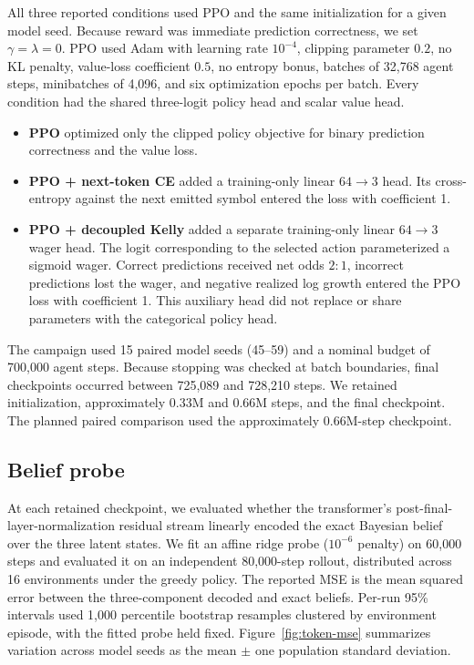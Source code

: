 \documentclass[11pt]{article}
\begin{document}
All three reported conditions used PPO and the same initialization for a given
model seed. Because reward was immediate prediction correctness, we set
\(\gamma=\lambda=0\). PPO used Adam with learning rate
\(10^{-4}\), clipping parameter \(0.2\), no KL penalty, value-loss coefficient
\(0.5\), no entropy bonus, batches of 32,768 agent steps, minibatches of 4,096,
and six optimization epochs per batch. Every condition had the shared
three-logit policy head and scalar value head.

\begin{itemize}
  \item \textbf{PPO} optimized only the clipped policy objective for binary
    prediction correctness and the value loss.
  \item \textbf{PPO + next-token CE} added a training-only linear
    \(64\!\rightarrow\!3\) head. Its cross-entropy against the next emitted
    symbol entered the loss with coefficient 1.
  \item \textbf{PPO + decoupled Kelly} added a separate training-only linear
    \(64\!\rightarrow\!3\) wager head. The logit corresponding to the selected
    action parameterized a sigmoid wager. Correct predictions received net
    odds \(2{:}1\), incorrect predictions lost the wager, and negative realized
    log growth entered the PPO loss with coefficient 1. This auxiliary head
    did not replace or share parameters with the categorical policy head.
\end{itemize}

The campaign used 15 paired model seeds (45--59) and a nominal budget of
700,000 agent steps. Because stopping was checked at batch boundaries, final
checkpoints occurred between 725,089 and 728,210 steps. We retained
initialization, approximately 0.33M and 0.66M steps, and the final checkpoint.
The planned paired comparison used the approximately 0.66M-step checkpoint.

\subsection{Belief probe}

At each retained checkpoint, we evaluated whether the transformer's
post-final-layer-normalization residual stream linearly encoded the exact
Bayesian belief over the three latent states. We fit an affine ridge probe
(\(10^{-6}\) penalty) on 60,000 steps and evaluated it on an independent
80,000-step rollout, distributed across 16 environments under the greedy
policy. The reported MSE is the mean squared error between the three-component
decoded and exact beliefs. Per-run 95\% intervals used 1,000 percentile
bootstrap resamples clustered by environment episode, with the fitted probe
held fixed. Figure~\ref{fig:token-mse} summarizes variation across model seeds
as the mean \(\pm\) one population standard deviation.
\end{document}
